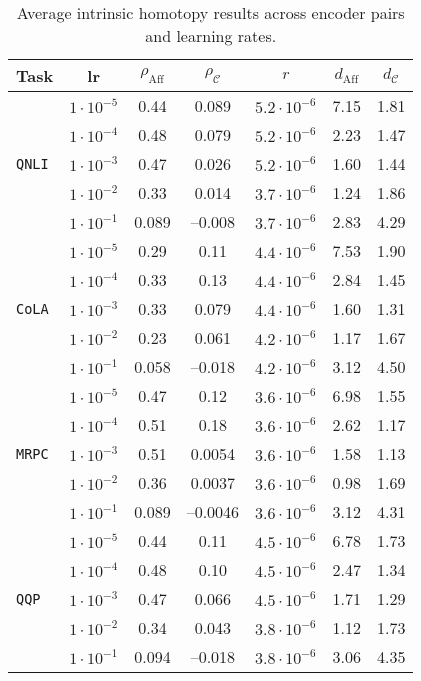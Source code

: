\begin{table}[H]
\centering
\caption{Average intrinsic homotopy results across encoder pairs and learning rates.}
\label{tab:intrinsic-homotopy-results}
\begin{tabular}{l c c c c c c}
\toprule
\textbf{Task} & \textbf{lr} & \(\rho_{\mathrm{Aff}}\) & \(\rho_{\mathcal{C}}\) & \(r\) & \(d_{\mathrm{Aff}}\) & \(d_{\mathcal{C}}\) \\
\midrule

\multirow{5}{*}{\texttt{QNLI}}
& \(1\cdot10^{-5}\) & 0.44 & 0.089  & \(5.2\cdot10^{-6}\) & 7.15 & 1.81 \\
& \(1\cdot10^{-4}\) & 0.48 & 0.079  & \(5.2\cdot10^{-6}\) & 2.23 & 1.47 \\
& \(1\cdot10^{-3}\) & 0.47 & 0.026  & \(5.2\cdot10^{-6}\) & 1.60 & 1.44 \\
& \(1\cdot10^{-2}\) & 0.33 & 0.014  & \(3.7\cdot10^{-6}\) & 1.24 & 1.86 \\
& \(1\cdot10^{-1}\) & 0.089 & –0.008 & \(3.7\cdot10^{-6}\) & 2.83 & 4.29 \\

\midrule
\multirow{5}{*}{\texttt{CoLA}}
& \(1\cdot10^{-5}\) & 0.29 & 0.11   & \(4.4\cdot10^{-6}\) & 7.53 & 1.90 \\
& \(1\cdot10^{-4}\) & 0.33 & 0.13   & \(4.4\cdot10^{-6}\) & 2.84 & 1.45 \\
& \(1\cdot10^{-3}\) & 0.33 & 0.079  & \(4.4\cdot10^{-6}\) & 1.60 & 1.31 \\
& \(1\cdot10^{-2}\) & 0.23 & 0.061  & \(4.2\cdot10^{-6}\) & 1.17 & 1.67 \\
& \(1\cdot10^{-1}\) & 0.058 & –0.018 & \(4.2\cdot10^{-6}\) & 3.12 & 4.50 \\

\midrule
\multirow{5}{*}{\texttt{MRPC}}
& \(1\cdot10^{-5}\) & 0.47 & 0.12   & \(3.6\cdot10^{-6}\) & 6.98 & 1.55 \\
& \(1\cdot10^{-4}\) & 0.51 & 0.18   & \(3.6\cdot10^{-6}\) & 2.62 & 1.17 \\
& \(1\cdot10^{-3}\) & 0.51 & 0.0054 & \(3.6\cdot10^{-6}\) & 1.58 & 1.13 \\
& \(1\cdot10^{-2}\) & 0.36 & 0.0037 & \(3.6\cdot10^{-6}\) & 0.98 & 1.69 \\
& \(1\cdot10^{-1}\) & 0.089 & –0.0046 & \(3.6\cdot10^{-6}\) & 3.12 & 4.31 \\

\midrule
\multirow{5}{*}{\texttt{QQP}}
& \(1\cdot10^{-5}\) & 0.44 & 0.11   & \(4.5\cdot10^{-6}\) & 6.78 & 1.73 \\
& \(1\cdot10^{-4}\) & 0.48 & 0.10   & \(4.5\cdot10^{-6}\) & 2.47 & 1.34 \\
& \(1\cdot10^{-3}\) & 0.47 & 0.066  & \(4.5\cdot10^{-6}\) & 1.71 & 1.29 \\
& \(1\cdot10^{-2}\) & 0.34 & 0.043  & \(3.8\cdot10^{-6}\) & 1.12 & 1.73 \\
& \(1\cdot10^{-1}\) & 0.094 & –0.018 & \(3.8\cdot10^{-6}\) & 3.06 & 4.35 \\


\end{tabular}
\end{table}
